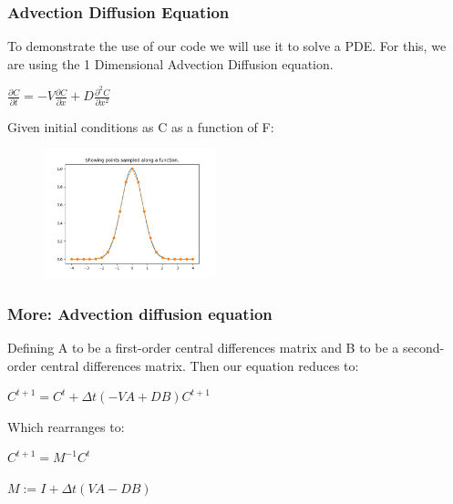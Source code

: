 \documentclass{beamer}
\begin{document}
\begin{frame}
\frametitle{Advection Diffusion Equation}

To demonstrate the use of our code we will use it to solve a PDE. For this, we are using the 1 Dimensional Advection Diffusion equation.

\begin{center}
    $\frac{\partial C}{\partial t} = - V\frac{\partial C}{\partial x} + D\frac{\partial^2 C}{\partial x^2}$
\end{center}

Given initial conditions as C as a function of F:

\begin{figure}
\centering
    \includegraphics[width=5cm]{images/show_sampling.png}
    \label{fig:sampling}
\end{figure}

\end{frame}

\begin{frame}
\frametitle{More: Advection diffusion equation}

Defining A to be a first-order central differences matrix and B to be a second-order central differences matrix. Then our equation reduces to:
\begin{center}
    $C^{t+1} = C^{t} + \Delta t (-VA + DB) C^{t+1}$
\end{center}

Which rearranges to:

\begin{center}
    $C^{t+1} = M^{-1} C^{t}$
    
    $M := I + \Delta t(VA - DB)$
\end{center}

\end{frame}
\end{document}
